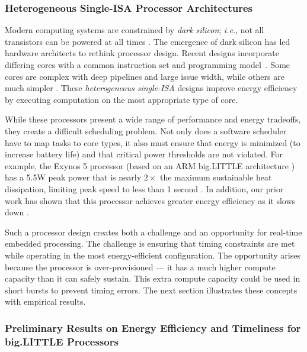  
\subsubsection{Heterogeneous Single-ISA Processor Architectures}
Modern computing systems are constrained by \emph{dark silicon};
\emph{i.e.}, not all transistors can be powered at all times
\cite{DaSi2011,Venkatesh2010}.  The emergence of dark silicon has led
hardware architects to rethink processor design.  Recent designs
incorporate differing cores with a common instruction set and
programming model~\cite{Kumar.2005.heterogeneous,SulemanMQP09}.  Some
cores are complex with deep pipelines and large issue width, while
others are much simpler \cite{bigLittle}.  These \emph{heterogeneous
single-ISA} designs improve energy efficiency by executing computation
on the most appropriate type of core.

While these processors present a wide range of performance and energy
tradeoffs, they create a difficult scheduling problem.  Not only does
a software scheduler have to map tasks to core types, it also must
ensure that energy is minimized (to increase battery life) and that
critical power thresholds are not violated.  For example, the Exynos
5 processor (based on an ARM big.LITTLE architecture \cite{bigLittle})
has a 5.5W peak power that is nearly $2 \times$ the maximum
sustainable heat dissipation, limiting peak speed to less than 1
second \cite{exynos5}.  In addition, our prior work has shown that
this processor achieves greater energy efficiency as it slows down
\cite{Imes2014}.  

Such a processor design creates both a challenge and an opportunity
for real-time embedded processing. The challenge is ensuring that
timing constraints are met while operating in the most
energy-efficient configuration.  The opportunity arises because the
processor is over-provisioned --- it has a much higher compute capacity
than it can safely sustain.  This extra compute capacity could be used
in short bursts to prevent timing errors.  The next section
illustrates these concepts with empirical results.

\subsubsection{Preliminary Results on Energy Efficiency and Timeliness for big.LITTLE Processors}

